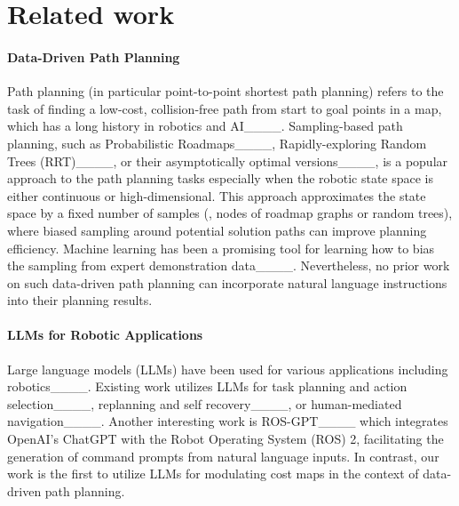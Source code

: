 \section{Related work}
\paragraph{Data-Driven Path Planning}
Path planning (in particular point-to-point shortest path planning) refers to the task of finding a low-cost, collision-free path from start to goal points in a map, which has a long history in robotics and AI____. Sampling-based path planning, such as Probabilistic Roadmaps____, Rapidly-exploring Random Trees (RRT)____, or their asymptotically optimal versions____, is a popular approach to the path planning tasks especially when the robotic state space is either continuous or high-dimensional. This approach approximates the state space by a fixed number of samples (\ie, nodes of roadmap graphs or random trees), where biased sampling around potential solution paths can improve planning efficiency. Machine learning has been a promising tool for learning how to bias the sampling from expert demonstration data____. Nevertheless, no prior work on such data-driven path planning can incorporate natural language instructions into their planning results.

\paragraph{LLMs for Robotic Applications}
Large language models (LLMs) have been used for various applications including robotics____. Existing work utilizes LLMs for task planning and action selection____, replanning and self recovery____, or human-mediated navigation____. Another interesting work is ROS-GPT____ which integrates OpenAI's ChatGPT with the Robot Operating System (ROS) 2, facilitating the generation of command prompts from natural language inputs. In contrast, our work is the first to utilize LLMs for modulating cost maps in the context of data-driven path planning.